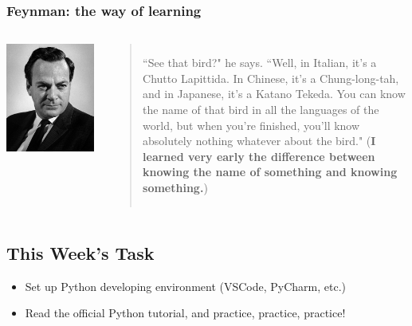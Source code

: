 \documentclass[aspectratio=169, 14pt]{beamer}
\begin{document}
\begin{frame}
	\frametitle{Feynman: the way of learning}
	\begin{columns}
		\includegraphics[height=0.5\paperheight]{week0/feynman}
		\begin{quote}
			``See that bird?" he says. ``Well, in Italian, it's a Chutto Lapittida. In Chinese, it's a Chung-long-tah, and in Japanese, it's a Katano Tekeda. You can know the name of that bird in all the languages of the world, but when you're finished, you'll know absolutely nothing whatever about the bird."
			(\textbf{\alert{I learned very early the difference between knowing the name of something and knowing something.}})
		\end{quote}
	\end{columns}

\end{frame}

\begin{frame}
	\section{\textcolor{darkmidnightblue}{This Week's Task}}
	\begin{itemize}
		\item Set up Python developing environment (VSCode, PyCharm, etc.)
		\item Read the official Python tutorial, and practice, practice, practice!
	\end{itemize}
\end{frame}
\end{document}
